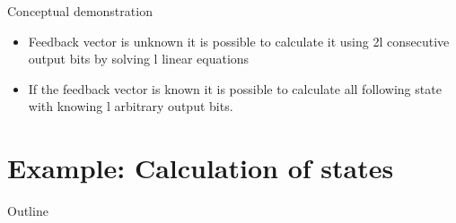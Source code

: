 \documentclass[]{beamer}
\begin{document}
\begin{frame}[t]{Conceptual demonstration}
\begin{itemize}
 \item Feedback vector is unknown it is possible to calculate it using 2l consecutive output bits by solving l linear equations
      \item<4-> If the feedback vector is known it is possible to calculate all following state with knowing l arbitrary output bits.
\end{itemize}
\end{frame}

\section{Example: Calculation of states}

\begin{frame}[t]{Outline}
\tableofcontents[currentsection]
\end{frame}
\end{document}
